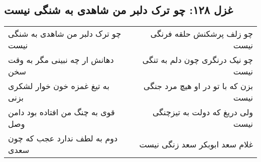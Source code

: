 \begin{center}
\section*{غزل ۱۲۸: چو ترک دلبر من شاهدی به شنگی نیست}
\label{sec:128}
\begin{longtable}{l p{0.5cm} r}
چو ترک دلبر من شاهدی به شنگی نیست
&&
چو زلف پرشکنش حلقه فرنگی نیست
\\
دهانش ار چه نبینی مگر به وقت سخن
&&
چو نیک درنگری چون دلم به تنگی نیست
\\
به تیغ غمزه خون خوار لشکری بزنی
&&
بزن که با تو در او هیچ مرد جنگی نیست
\\
قوی به چنگ من افتاده بود دامن وصل
&&
ولی دریغ که دولت به تیزچنگی نیست
\\
دوم به لطف ندارد عجب که چون سعدی
&&
غلام سعد ابوبکر سعد زنگی نیست
\\
\end{longtable}
\end{center}
